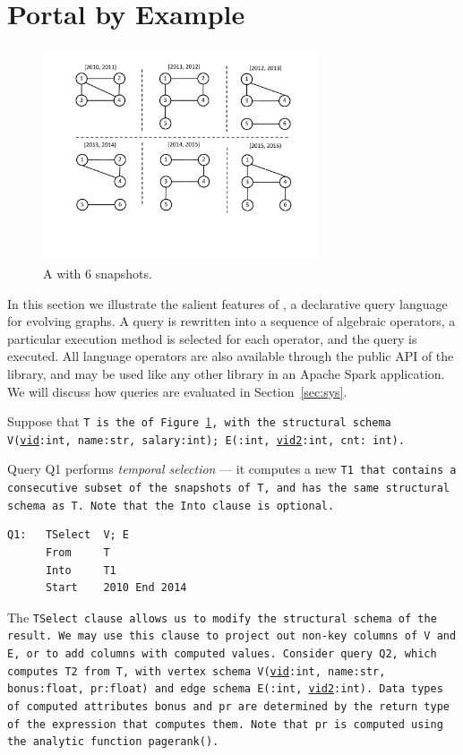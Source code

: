 \section{Portal by Example}
\label{sec:example}

\begin{figure}
\includegraphics[width=3.2in]{figs/6snaps.pdf}
\caption{A \tg with 6 snapshots.} 
\label{fig:tg}
\end{figure}

In this section we illustrate the salient features of \ql, a
declarative query language for evolving graphs.  A \ql query is
rewritten into a sequence of algebraic operators, a particular
execution method is selected for each operator, and the query is
executed.  All language operators are also available through the
public API of the \ql library, and may be used like any other library
in an Apache Spark application.  We will discuss how \ql queries are
evaluated in Section~\ref{sec:sys}.

Suppose that \tt{T} is the \tg of Figure~\ref{fig:tg}, with the
structural schema V(\underline{vid}:int, name:str, salary:int);
E(:int, \underline{vid2}:int, cnt: int).

Query Q1 performs {\em temporal selection} --- it computes a new \tg
\tt{T1} that contains a consecutive subset of the snapshots of \tt{T},
and has the same structural schema as \tt{T}.  Note that the \tt{Into}
clause is optional.

\begin{verbatim}
Q1:   TSelect  V; E
      From     T
      Into     T1
      Start    2010 End 2014
\end{verbatim}

The \tt{TSelect} clause allows us to modify the structural schema of
the result.  We may use this clause to project out non-key columns of
\tt{V} and \tt{E}, or to add columns with computed values.  Consider
query Q2, which computes \tt{T2} from \tt{T}, with vertex schema
V(\underline{vid}:int, name:str, bonus:float, pr:float) and edge
schema E(:int, \underline{vid2}:int).  Data types of
computed attributes \tt{bonus} and \tt{pr} are determined by the
return type of the expression that computes them.  Note that \tt{pr}
is computed using the analytic function \tt{pagerank()}.

